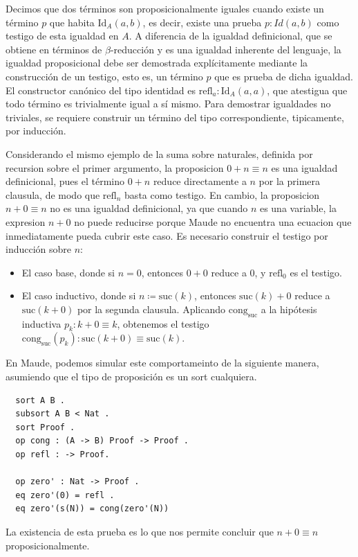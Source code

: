 \begin{definition} Decimos que dos términos son proposicionalmente iguales cuando existe un término $p$ que habita $\text{Id}_{A}(a, b)$, es decir, existe una prueba $p : Id(a, b)$ como testigo de esta igualdad en $A$. A diferencia de la igualdad definicional, que se obtiene en términos de $\beta$-reducción y es una igualdad inherente del lenguaje, la igualdad proposicional debe ser demostrada explícitamente mediante la construcción de un testigo, esto es, un término $p$ que es prueba de dicha igualdad. El constructor canónico del tipo identidad es $\text{refl}_a : \text{Id}_A(a, a)$, que atestigua que todo término es trivialmente igual a sí mismo. Para demostrar igualdades no triviales, se requiere construir un término del tipo correspondiente, tipicamente, por inducción.
\newline
\begin{example}
Considerando el mismo ejemplo de la suma sobre naturales, definida por recursion sobre el primer argumento, la proposicion $0 + n \equiv n$ es una igualdad definicional, pues el término $0 + n$
reduce directamente a $n$ por la primera clausula, de modo que $\text{refl}_n$
basta como testigo. En cambio, la proposicion $n + 0 \equiv n$ no es una igualdad
definicional, ya que cuando $n$ es una variable, la expresion $n + 0$ no puede
reducirse porque Maude no encuentra una ecuacion que inmediatamente pueda cubrir este caso. Es necesario construir el
testigo por inducción sobre $n$:
\begin{itemize}
  \item El caso base, donde si $n = 0$, entonces $0 + 0$ reduce a $0$, y $\text{refl}_0$
        es el testigo.
  \item El caso inductivo, donde si $n \coloneqq \text{suc}(k)$, entonces $\text{suc}(k) + 0$ reduce a
        $\text{suc}(k + 0)$ por la segunda clausula. Aplicando
        $\text{cong}_{\text{suc}}$ a la hipótesis inductiva $p_k : k + 0 \equiv k$,
        obtenemos el testigo $\text{cong}_{\text{suc}}(p_k) : \text{suc}(k + 0) \equiv \text{suc}(k)$.
\end{itemize}

En Maude, podemos simular este comportameinto de la siguiente manera, asumiendo que el tipo de proposición es un sort cualquiera.
\begin{lstlisting}
  sort A B .
  subsort A B < Nat .
  sort Proof .
  op cong : (A -> B) Proof -> Proof .
  op refl : -> Proof.

  op zero' : Nat -> Proof .
  eq zero'(0) = refl .
  eq zero'(s(N)) = cong(zero'(N))
\end{lstlisting}
\end{example}

La existencia de esta prueba es lo que nos permite concluir que $n + 0 \equiv n$ proposicionalmente.
\end{definition}

